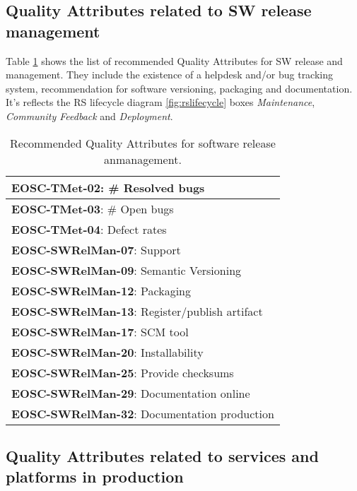 \subsection{Quality Attributes related to SW release management}

Table \ref{tab:rs_rel} shows the list of recommended Quality Attributes for SW release and management. They include the existence of a helpdesk and/or bug tracking system, recommendation for software versioning, packaging and documentation. It's reflects the RS lifecycle diagram \ref{fig:rslifecycle} boxes \textit{Maintenance}, \textit{Community Feedback} and \textit{Deployment}.

\begin{center}
\begin{table}
    \label{tab:rs_rel}
    \small
    \begin{tabular}{|p{\linewidth}|}

        \textbf{EOSC-TMet-02}: \# Resolved bugs \\ \hline
        \textbf{EOSC-TMet-03}: \# Open bugs \\ \hline
        \textbf{EOSC-TMet-04}: Defect rates \\ \hline
        \textbf{EOSC-SWRelMan-07}: Support \\ \hline
        \textbf{EOSC-SWRelMan-09}: Semantic Versioning \\ \hline
        \textbf{EOSC-SWRelMan-12}: Packaging \\ \hline
        \textbf{EOSC-SWRelMan-13}: Register/publish artifact \\ \hline
        \textbf{EOSC-SWRelMan-17}: SCM tool \\ \hline
        \textbf{EOSC-SWRelMan-20}: Installability \\ \hline
        \textbf{EOSC-SWRelMan-25}: Provide checksums \\ \hline
        \textbf{EOSC-SWRelMan-29}: Documentation online \\ \hline
        \textbf{EOSC-SWRelMan-32}: Documentation production \\ \hline

    \end{tabular}
    \caption{Recommended Quality Attributes for software release anmanagement.}
\end{table}
\end{center}

\subsection{Quality Attributes related to services and platforms in production}

